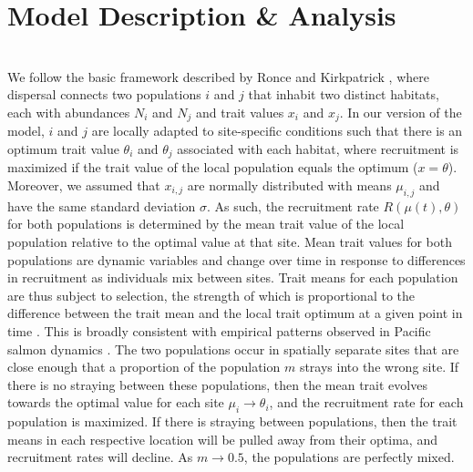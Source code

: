 \documentclass{revtex4}
\begin{document}
\section{Model Description \& Analysis}

\\
\noindent We follow the basic framework described by Ronce and Kirkpatrick \citep{Ronce:2001dp}, where dispersal connects two populations $i$ and $j$ that inhabit two distinct habitats, each with abundances $N_i$ and $N_j$ and trait values $x_i$ and $x_j$.
In our version of the model, $i$ and $j$ are locally adapted to site-specific conditions such that there is an optimum trait value $\theta_i$ and $\theta_j$ associated with each habitat, where recruitment is maximized if the trait value of the local population equals the optimum ($x = \theta$).
Moreover, we assumed that $x_{i,j}$ are normally distributed with means $\mu_{i,j}$ and have the same standard deviation $\sigma$.
As such, the recruitment rate $R(\mu(t),\theta)$ for both populations is determined by the mean trait value of the local population relative to the optimal value at that site.
Mean trait values for both populations are dynamic variables and change over time in response to differences in recruitment as individuals mix between sites.
Trait means for each population are thus subject to selection, the strength of which is proportional to the difference between the trait mean and the local trait optimum at a given point in time \citep{simpson1953major,Lande:1976ga,Ronce:2001dp}.
This is broadly consistent with empirical patterns observed in Pacific salmon dynamics \citep{Reisenbichler:1988ex}.
The two populations occur in spatially separate sites that are close enough that a proportion of the population $m$ strays into the wrong site.
If there is no straying between these populations, then the mean trait evolves towards the optimal value for each site $\mu_i \rightarrow \theta_i$, and the recruitment rate for each population is maximized.
If there is straying between populations, then the trait means in each respective location will be pulled away from their optima, and recruitment rates will decline.
As $m \rightarrow 0.5$, the populations are perfectly mixed.
\end{document}

